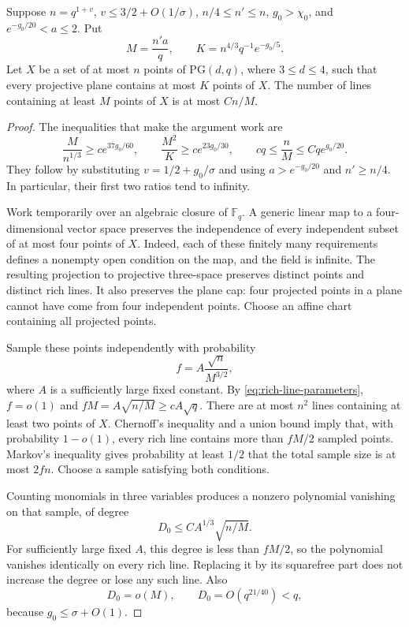 \begin{lemma}\label{lem:rich-lines}
Suppose $n=q^{1+v}$, $v\le 3/2+O(1/\sigma)$,
$n/4\le n'\le n$, $g_0>\chi_0$, and
$e^{-g_0/20}<a\le2$.  Put
\[
 M=\frac{n'a}{q},\qquad
 K=n^{4/3}q^{-1}e^{-g_0/5}.
\]
Let $X$ be a set of at most $n$ points of $\mathrm{PG}(d,q)$, where
$3\le d\le4$, such that every projective plane contains at most $K$
points of $X$.  The number of lines containing at least $M$ points of $X$
is at most $Cn/M$.
\end{lemma}

\begin{proof}
The inequalities that make the argument work are
\begin{equation}\label{eq:rich-line-parameters}
 \frac{M}{n^{1/3}}\ge c e^{37g_0/60},\qquad
 \frac{M^2}{K}\ge c e^{23g_0/30},\qquad
 cq\le\frac nM\le Cq e^{g_0/20}.
\end{equation}
They follow by substituting $v=1/2+g_0/\sigma$ and using
$a>e^{-g_0/20}$ and $n'\ge n/4$.  In particular, their first two
ratios tend to infinity.

Work temporarily over an algebraic closure of $\mathbb F_q$.  A generic
linear map to a four-dimensional vector space preserves the independence
of every independent subset of at most four points of $X$.  Indeed, each
of these finitely many requirements defines a nonempty open condition on
the map, and the field is infinite.  The resulting projection to
projective three-space preserves distinct points and distinct rich lines.
It also preserves the plane cap: four projected points in a plane cannot
have come from four independent points.  Choose an affine chart containing
all projected points.

Sample these points independently with probability
\[
 f=A\frac{\sqrt n}{M^{3/2}},
\]
where $A$ is a sufficiently large fixed constant.  By
\eqref{eq:rich-line-parameters}, $f=o(1)$ and
$fM=A\sqrt{n/M}\ge cA\sqrt q$.  There are at most $n^2$ lines containing
at least two points of $X$.  Chernoff's inequality and a union bound imply
that, with probability $1-o(1)$, every rich line contains more than $fM/2$
sampled points.  Markov's inequality gives probability at least $1/2$ that
the total sample size is at most $2fn$.  Choose a sample satisfying both
conditions.

Counting monomials in three variables produces a nonzero polynomial
vanishing on that sample, of degree
\[
 D_0\le C A^{1/3}\sqrt{n/M}.
\]
For sufficiently large fixed $A$, this degree is less than $fM/2$, so the
polynomial vanishes identically on every rich line.  Replacing it by its
squarefree part does not increase the degree or lose any such line.  Also
\begin{equation}\label{eq:degree-characteristic}
 D_0=o(M),\qquad D_0=O(q^{21/40})<q,
\end{equation}
because $g_0\le\sigma+O(1)$.


\end{proof}
